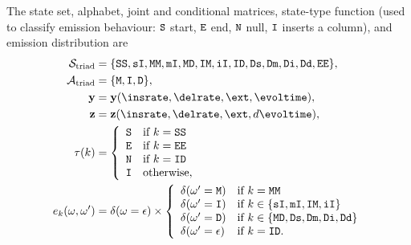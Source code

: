 The state set, alphabet, joint and conditional matrices, state-type function
(used to classify emission behaviour: $\mathtt{S}$ start, $\mathtt{E}$ end, $\mathtt{N}$ null,
$\mathtt{I}$ inserts a column), and emission distribution are
\begin{align*}
\triadstates &= \{ \triadstart,\stains,\matmat,\matins,\matdel,\insmat,\insins,\insdel,\delsta,\delmat,\delins,\deldel,\triadend \}, \\
\triadalphabet &= \{ \mat, \ins, \del \}, \\
\ymx &= \jointpairmatrix(\insrate,\delrate,\fragext,\evoltime), \\
\zmx &= \condpairmatrix(\insrate,\delrate,\fragext,d\evoltime), \\
\statetype(k) &= \left\{ \begin{array}{ll}
 \sta & \mbox{if $k = \triadstart$} \\
 \fin & \mbox{if $k = \triadend$} \\
 \nul & \mbox{if $k = \insdel$} \\
 \ins & \mbox{otherwise,}
 \end{array} \right. \\
e_k(\omega,\omega') &= \delta(\omega=\epsilon) \times \left\{ \begin{array}{ll}
 \delta(\omega'=\mat) & \mbox{if $k = \matmat$} \\
 \delta(\omega'=\ins) & \mbox{if $k \in \{ \stains,\matins,\insmat,\insins \}$} \\
 \delta(\omega'=\del) & \mbox{if $k \in \{ \matdel,\delsta,\delmat,\delins,\deldel \}$} \\
 \delta(\omega'=\epsilon) & \mbox{if $k = \insdel.$}
 \end{array} \right.
\end{align*}

